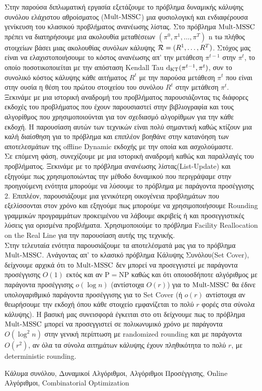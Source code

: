 \begin{abstractgr}%
  Στην παρούσα διπλωματική εργασία εξετάζουμε το πρόβλημα δυναμικής κάλυψης συνόλου ελάχιστου αθροίσματος ($\mathrm{Mult}\text{-}\mathrm{MSSC}$) μια φυσιολογική και ενδιαφέρουσα γενίκευση του κλασικού προβλήματος ανανέωσης λίστας. Στο πρόβλημα $\mathrm{Mult}\text{-}\mathrm{MSSC}$ πρέπει να διατηρήσουμε μια ακολουθία μεταθέσεων $(\pi^0, \pi^1, \ldots, \pi^T)$ n τω πλήθος στοιχείων βάσει μιας ακολουθίας συνόλων κάλυψης $\mathcal{R} = (R^1, \ldots, R^T)$. Στόχος μας είναι να ελαχιστοποιήσουμε το κόστος ανανέωσης απ' την μετάθεση $\pi^{t-1}$ στην $\pi^{t}$, το οποίο ποσοτικοποιείται με την απόσταση Kendall Tau $\mathrm{d}_{\mathrm{KT}}(\pi^{t-1}, \pi^t)$, συν το συνολικό κόστος κάλυψης κάθε αιτήματος $R^t$ με την παρούσα μετάθεση $\pi^t$ που είναι στην ουσία η θέση του πρώτου στοιχείου του συνόλου $R^t$ στην μετάθεση $\pi^t$. \\
  
  \noindent Ξεκινάμε με μια ιστορική αναδρομή του προβλήματος παρουσιάζοντας τις διάφορες εκδοχές του προβλήματος που έχουν παρουσιαστεί στην βιβλιογραφία και τους αλγορίθμος που χρησιμοποιούνται για τον σχεδιασμό αλγορίθμων για την κάθε εκδοχή. Η παρουσίαση αυτών των τεχνικών είναι πολύ σημαντική καθώς κτίζουν μια καλή διαίσθηση για το πρόβλημα και επιπλέον βοηθάνε στην κατανόηση των αποτελεσμάτων της offline Dynamic εκδοχής με την οποία και ασχολούμαστε. \\
  
  \noindent Σε επόμενη φάση, συνεχίζουμε με μια ιστορική αναδρομή καθώς και παραλλαγές του προβλήματος. Ξεκινάμε με το πρόβλημα ανανέωσης λίστας(List-Update) και εξηγούμε πως χρησιμοποιώντας την μέθοδο δυναμικού που περιγράψαμε στην προηγούμενη ενότητα μπορούμε να λύσουμε το πρόβλημα με παράγοντα προσέγγισης 2. Επιπλέον, παρουσιάζουμε μια γενικότερη οικογένεια προβλημάτων που εξελίσσονται στον χρόνο και εξηγούμε πως μπορούμε να χρησιμοποιήσουμε Rounding γραμμικών προγραμμάτων προκειμένου να λάβουμε ακριβείς ή και προσεγγιστικές λύσεις για ορισμένα προβλήματα. Χρησιμοποιούμε το πρόβλημα Facility Reallocation on the Real Line για την παρουσίαση αυτής της τεχνικής. \\
  
 \noindent Στην τελευταία ενότητα παρουσιάζουμε τα αποτελέσματά μας για το πρόβλημα $\mathrm{Mult}\text{-}\mathrm{MSSC}$. Ανάγοντας απ' το κλασικό πρόβλημα Κάλυψης Συνόλου(Set Cover), δείχνουμε αρχικά ότι το $\mathrm{Mult}\text{-}\mathrm{MSSC}$ δεν μπορεί να προσεγγιστεί με παράγοντα προσέγγισης $O(1)$ εκτός και αν $\mathrm{P} = \mathrm{NP}$ καθώς και ότι οποιοσδήποτε αλγόριθμος με παράγοντα προσέγγισης $o( \log n)$ (αντίστοιχα $O(r)$) για το $\mathrm{Mult}\text{-}\mathrm{MSSC}$ θα έδινε υπολογαριθμικό παράγοντα προσέγγισης για το Set Cover (ή $ο(r)$ αντίστοιχα αν θεωρήσουμε την εκδοχή όπου κάθε στοιχείο εμφανίζεται το πολύ $r$ φορές στα σύνολα κάλυψης). Η βασική μας συνεισφορά έγκειται στο οτι δείχνουμε πως το πρόβλημα $\mathrm{Mult}\text{-}\mathrm{MSSC}$ μπορεί να προσεγγιστεί σε πολυωνυμικό χρόνο με παράγοντα $O( \log^2 n )$ στην γενική περίπτωση με randomized rounding και με παράγοντα $O(r^2)$, αν όλα τα σύνολα αιτημάτων κάλυψης έχουν πληθικότητα το πολύ $r$, με deterministic rounding.
\begin{keywordsgr}
  Κάλυμα συνόλου,
  Δυναμικοί Αλγόριθμοι,
  Αλγόριθμοι Προσέγγισης,
  Online Αλγόριθμοι,
  Combinatorial Optimization
\end{keywordsgr}


\end{abstractgr}
